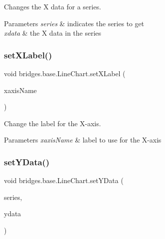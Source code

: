 Changes the X data for a series. 


\begin{DoxyParams}{Parameters}
{\em series} & indicates the series to get \\
\hline
{\em xdata} & the X data in the series \\
\hline
\end{DoxyParams}
\mbox{\label{classbridges_1_1base_1_1_line_chart_ab402a1134bb79919860368a234f62ea2}} 
\subsubsection{\texorpdfstring{setXLabel()}{setXLabel()}}
{\footnotesize\ttfamily void bridges.\+base.\+Line\+Chart.\+set\+X\+Label (\begin{DoxyParamCaption}\item[{String}]{xaxis\+Name }\end{DoxyParamCaption})}



Change the label for the X-\/axis. 


\begin{DoxyParams}{Parameters}
{\em xaxis\+Name} & label to use for the X-\/axis \\
\hline
\end{DoxyParams}
\mbox{\label{classbridges_1_1base_1_1_line_chart_a3076dc99debb599529169de40815aba2}} 
\subsubsection{\texorpdfstring{setYData()}{setYData()}\hspace{0.1cm}{\footnotesize\ttfamily [1/2]}}
{\footnotesize\ttfamily void bridges.\+base.\+Line\+Chart.\+set\+Y\+Data (\begin{DoxyParamCaption}\item[{String}]{series,  }\item[{Array\+List$<$ Double $>$}]{ydata }\end{DoxyParamCaption})}




